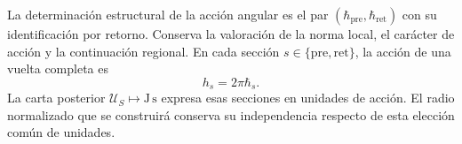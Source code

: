 La determinación estructural de la acción angular es el par
\((\hbar_{\mathrm{pre}},\hbar_{\mathrm{ret}})\) con su
identificación por retorno. Conserva la valoración de la norma
local, el carácter de acción y la continuación regional.
En cada sección \(s\in\{\mathrm{pre},\mathrm{ret}\}\), la acción
de una vuelta completa es
\begin{equation}
 h_s=2\pi\hbar_s.
 \label{x_reciprocidad:iv:action:vuelta}
\end{equation}
La carta posterior \(\mathcal U_S\mapsto\mathrm{J\,s}\) expresa
esas secciones en unidades de acción. El radio normalizado que
se construirá conserva su independencia respecto de esta elección
común de unidades.
